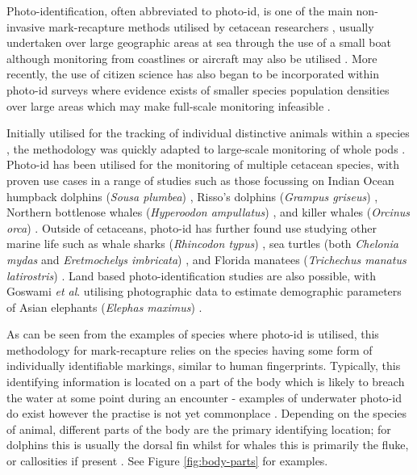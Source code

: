 Photo-identification, often abbreviated to photo-id, is one of the main non-invasive mark-recapture methods utilised by cetacean researchers \cite{hammond_individual_1990, evans_monitoring_2004}, usually undertaken over large geographic areas at sea through the use of a small boat although monitoring from coastlines or aircraft may also be utilised \cite{payne_long_1986, forney_seasonal_1998, wursig_methods_1990}. More recently, the use of citizen science has also began to be incorporated within photo-id surveys where evidence exists of smaller species population densities over large areas which may make full-scale monitoring infeasible \cite{gibson_using_2020, cheney_integrating_2013}.

Initially utilised for the tracking of individual distinctive animals within a species \cite{caldwell_evidence_1955, schevill_daily_1960}, the methodology was quickly adapted to large-scale monitoring of whole pods \cite{alves_population_2013, franklin_migratory_2008}. Photo-id has been utilised for the monitoring of multiple cetacean species, with proven use cases in a range of studies such as those focussing on Indian Ocean humpback dolphins (\textit{Sousa plumbea}) \cite{sharpe_indian_2019}, Risso's dolphins (\textit{Grampus griseus}) \cite{miragliuolo_rissos_2004}, Northern bottlenose whales (\textit{Hyperoodon ampullatus}) \cite{feyrer_origin_2021}, and killer whales (\textit{Orcinus orca}) \cite{bigg_assessment_1982}. Outside of cetaceans, photo-id has further found use studying other marine life such as whale sharks (\textit{Rhincodon typus}) \cite{holmberg_estimating_2009}, sea turtles (both \textit{Chelonia mydas} and \textit{Eretmochelys imbricata}) \cite{reisser_photographic_2008}, and Florida manatees (\textit{Trichechus manatus latirostris}) \cite{langtimm_survival_2004}. Land based photo-identification studies are also possible, with Goswami \textit{et al}. utilising photographic data to estimate demographic parameters of Asian elephants (\textit{Elephas maximus}) \cite{goswami_application_2007}.

As can be seen from the examples of species where photo-id is utilised, this methodology for mark-recapture relies on the species having some form of individually identifiable markings, similar to human fingerprints. Typically, this identifying information is located on a part of the body which is likely to breach the water at some point during an encounter - examples of underwater photo-id do exist however the practise is not yet commonplace \cite{vanbressem_visual_2018}. Depending on the species of animal, different parts of the body are the primary identifying location; for dolphins this is usually the dorsal fin whilst for whales this is primarily the fluke, or callosities if present \cite{vernazzani_eastern_2013, arnbom_individual_1987, constantine_abundance_2012, sharpe_indian_2019, baird_population_2009}. See Figure \ref{fig:body-parts} for examples.

